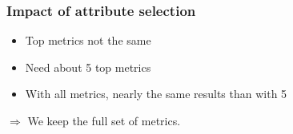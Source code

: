 \begin{frame}
 \frametitle{Impact of attribute selection}
 \begin{itemize}
  \item Top metrics not the same
  \item Need about 5 top metrics
  \item With all metrics, nearly the same results than with 5
 \end{itemize}
 \vspace{0.5cm}
 \begin{center}
  $\Longrightarrow$ \alert{We keep the full set of metrics.}
 \end{center}
\end{frame}
